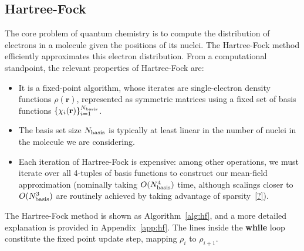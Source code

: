 \documentclass[twoside,11pt]{article}
\begin{document}
\subsection{Hartree-Fock}
The core problem of quantum chemistry is to compute the distribution of electrons in a molecule given the positions of its nuclei.  The Hartree-Fock method efficiently approximates this electron distribution.  From a computational standpoint, the relevant properties of Hartree-Fock are:
\begin{itemize}
\item It is a fixed-point algorithm, whose iterates are single-electron density functions $\rho(\mathbf r)$, represented as symmetric matrices using a fixed set of basis functions $\{\chi_i(\mathbf r)\}_{i=1}^{N_{\rm basis}}$.
\item The basis set size $N_{\rm basis}$ is typically at least linear in the number of nuclei in the molecule we are considering.
\item Each iteration of Hartree-Fock is expensive: among other operations, we must iterate over all 4-tuples of basis functions to construct our mean-field approximation (nominally taking $O(N_{\rm basis}^4)$ time, although scalings closer to $O(N_{\rm basis}^3)$ are routinely achieved by taking advantage of sparsity~\ref{?}).
\end{itemize}
The Hartree-Fock method is shown as Algorithm~\ref{alg:hf}, and a more detailed explanation is provided in Appendix~\ref{app:hf}.  The lines inside the \textbf{while} loop constitute the fixed point update step, mapping $\rho_i$ to $\rho_{i+1}$.
\end{document}

